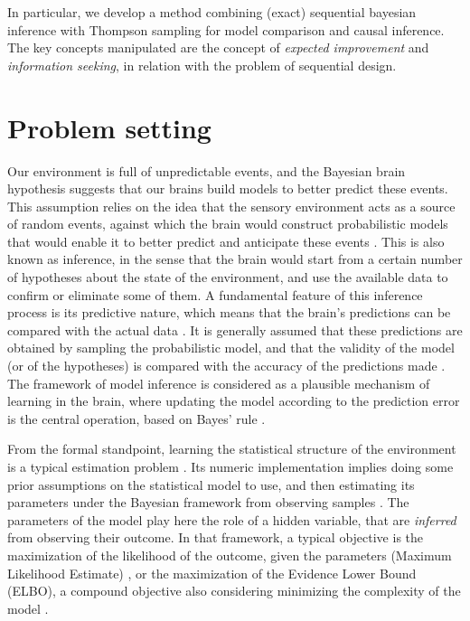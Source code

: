 \documentclass[10pt,letterpaper]{article}
\begin{document}
In particular, we develop a method combining (exact) sequential bayesian inference with Thompson sampling for model comparison and causal inference. The key concepts manipulated are the concept of \emph{expected improvement} and   
\emph{information seeking}, in relation with the problem of sequential design.


\section{Problem setting}

Our environment is full of unpredictable events, and the Bayesian brain hypothesis \cite{knill2004bayesian} suggests that our brains build models to better predict these events. This assumption relies on the idea that the sensory environment acts as a source of random events, against which the brain would construct probabilistic models that would enable it to better predict and anticipate these events \cite{friston2005theory}. This is also known as inference, in the sense that the brain would start from a certain number of hypotheses about the state of the environment, and use the available data to confirm or eliminate some of them. A fundamental feature of this inference process is its predictive nature, which means that the brain's predictions can be compared with the actual data \cite{rao1999predictive}. It is generally assumed that these predictions are obtained by sampling the probabilistic model, and that the validity of the model (or of the hypotheses) is compared with the accuracy of the predictions made \cite{griffiths2008bayesian}. The framework of model inference is considered as a plausible mechanism of learning in the brain, where updating the model according to the prediction error is the central operation, based on Bayes' rule \cite{doya2007bayesian,fiser2010statistically}.


From the formal standpoint, learning the statistical structure of the environment is a typical estimation problem \cite{bishop2006pattern}. Its numeric implementation implies doing some prior assumptions on the statistical model to use, and then estimating its parameters under the Bayesian framework from observing samples \cite{gelman1995bayesian}. The parameters of the model play here the role of a hidden variable, that are \emph{inferred} from observing their outcome. In that framework, a typical objective is the maximization of the likelihood of the outcome, given the parameters (Maximum Likelihood Estimate) \cite{myung2003tutorial}, or the maximization of the Evidence Lower Bound (ELBO), a compound objective also considering minimizing the complexity of the model \cite{kingma2013auto,blei2017variational}.
\end{document}
